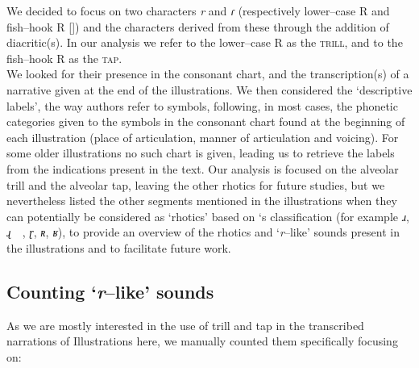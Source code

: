 We decided to focus on two characters \textit{r} and \textit{ɾ} (respectively lower–case R and fish–hook R [\cite{pullum1996phonetic}]) and the characters derived from these through the addition of diacritic(s). In our analysis we refer to the lower–case R as the \textsc{trill}, and to the fish–hook R as the \textsc{tap}.\\

We looked for their presence in the consonant chart, and the transcription(s) of a narrative given at the end of the illustrations. We then considered the ‘descriptive labels’, the way authors refer to symbols, following, in most cases, the phonetic categories given to the symbols in the consonant chart found at the beginning of each illustration (place of articulation, manner of articulation and voicing). For some older illustrations no such chart is given, leading us to retrieve the labels from the indications present in the text. Our analysis is focused on the alveolar trill and the alveolar tap, leaving the other rhotics for  future studies, but we nevertheless listed the other segments mentioned in the illustrations when they can potentially be considered as ‘rhotics’ based on \textcite{magnusonStoryTwoVocal2007}‘s classification (for example \textit{ɹ}, \textit{ɻ~~}, \textit{ɽ}, \textit{ʀ}, \textit{ʁ}), to provide an overview of the rhotics and ‘\textit{r}–like’ sounds present in the illustrations and to facilitate future work. 

\subsection{Counting ‘\textit{r}–like’ sounds}

As we are mostly interested in the use of trill and tap in the transcribed narrations of Illustrations here, we  manually counted them specifically focusing on:

